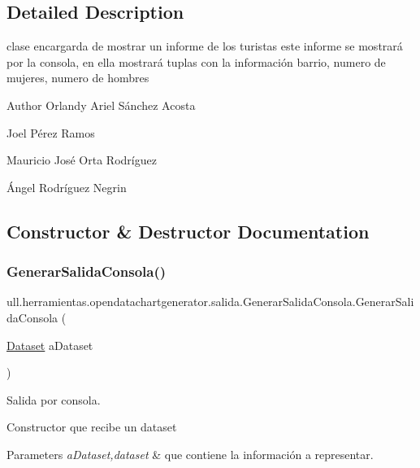 \subsection{Detailed Description}
clase encargarda de mostrar un informe de los turistas este informe se mostrará por la consola, en ella mostrará tuplas con la información barrio, numero de mujeres, numero de hombres 

\begin{DoxyAuthor}{Author}
Orlandy Ariel Sánchez Acosta 

Joel Pérez Ramos 

Mauricio José Orta Rodríguez 

Ángel Rodríguez Negrin 
\end{DoxyAuthor}


\subsection{Constructor \& Destructor Documentation}
\mbox{\label{classull_1_1herramientas_1_1opendatachartgenerator_1_1salida_1_1_generar_salida_consola_aa3947da04a8fa1cd2ad6e2713a370b86}} 
\subsubsection{\texorpdfstring{Generar\+Salida\+Consola()}{GenerarSalidaConsola()}}
{\footnotesize\ttfamily ull.\+herramientas.\+opendatachartgenerator.\+salida.\+Generar\+Salida\+Consola.\+Generar\+Salida\+Consola (\begin{DoxyParamCaption}\item[{\mbox{\hyperlink{classull_1_1herramientas_1_1opendatachartgenerator_1_1_dataset}{Dataset}}}]{a\+Dataset }\end{DoxyParamCaption})}



Salida por consola. 

Constructor que recibe un dataset 
\begin{DoxyParams}{Parameters}
{\em a\+Dataset,dataset} & que contiene la información a representar. \\
\hline
\end{DoxyParams}


